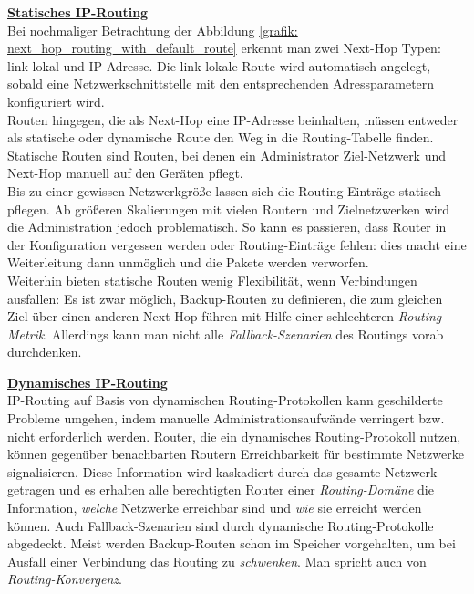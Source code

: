 \textbf{\underline{Statisches IP-Routing}}\\
Bei nochmaliger Betrachtung der Abbildung \ref{grafik: next_hop_routing_with_default_route} erkennt man zwei Next-Hop Typen: link-lokal und \glqq IP-Adresse\grqq{}. Die link-lokale Route wird automatisch angelegt, sobald eine Netzwerkschnittstelle mit den entsprechenden Adressparametern konfiguriert wird.\\
Routen hingegen, die als Next-Hop eine IP-Adresse beinhalten, müssen entweder als statische oder dynamische Route den Weg in die Routing-Tabelle finden. Statische Routen sind Routen, bei denen ein Administrator Ziel-Netzwerk und Next-Hop manuell auf den Geräten pflegt.\\
Bis zu einer gewissen Netzwerkgröße lassen sich die Routing-Einträge statisch pflegen. Ab größeren Skalierungen mit vielen Routern und Zielnetzwerken wird die Administration jedoch problematisch. So kann es passieren, dass Router in der Konfiguration vergessen werden oder Routing-Einträge fehlen: dies macht eine Weiterleitung dann unmöglich und die Pakete werden verworfen.\\
Weiterhin bieten statische Routen wenig Flexibilität, wenn Verbindungen ausfallen: Es ist zwar möglich, Backup-Routen zu definieren, die zum gleichen Ziel über einen anderen Next-Hop führen mit Hilfe einer schlechteren \textit{Routing-Metrik}. Allerdings kann man nicht alle \textit{Fallback-Szenarien} des Routings vorab durchdenken.

\textbf{\underline{Dynamisches IP-Routing}}\\
IP-Routing auf Basis von dynamischen Routing-Protokollen kann geschilderte Probleme umgehen, indem manuelle Administrationsaufwände verringert bzw. nicht erforderlich werden. Router, die ein dynamisches Routing-Protokoll nutzen, können gegenüber benachbarten Routern Erreichbarkeit für bestimmte Netzwerke signalisieren. Diese Information wird kaskadiert durch das gesamte Netzwerk getragen und es erhalten alle berechtigten Router einer \textit{Routing-Domäne} die Information, \textit{welche} Netzwerke erreichbar sind und \textit{wie} sie erreicht werden können. Auch Fallback-Szenarien sind durch dynamische Routing-Protokolle abgedeckt. Meist werden Backup-Routen schon im Speicher vorgehalten, um bei Ausfall einer Verbindung das Routing zu \textit{schwenken}. Man spricht auch von \textit{Routing-Konvergenz}.


